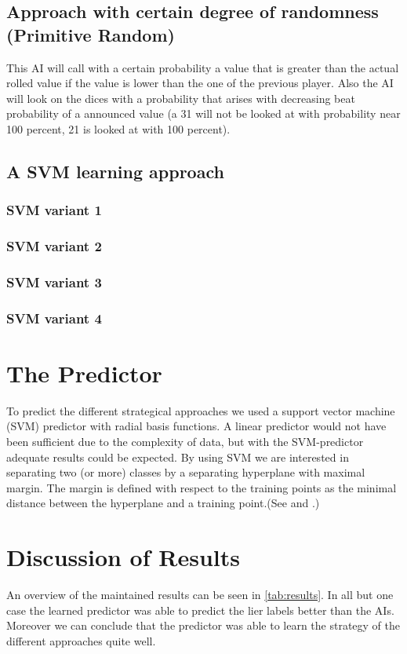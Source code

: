 \documentclass[11pt]{article}
\begin{document}
\subsection{Approach with certain degree of randomness (Primitive Random)}
This AI will call with a certain probability a value that is greater than the actual rolled value if the value is lower than the one of the previous player. Also the AI will look on the dices with a probability that arises with decreasing beat probability of a announced value (a 31 will not be looked at with probability near 100 percent, 21 is looked at with 100 percent). 

\subsection{A SVM learning approach}
\subsubsection{SVM variant 1}
\subsubsection{SVM variant 2}
\subsubsection{SVM variant 3}
\subsubsection{SVM variant 4}

\section{The Predictor}
To predict the different strategical approaches we used a support vector machine (SVM) predictor with radial basis functions. A linear predictor would not have been sufficient due to the complexity of data, but with the SVM-predictor adequate results could be expected.
By using SVM we are interested in separating two (or more) classes by a separating hyperplane with maximal margin. The margin is defined with respect to the training points as the minimal distance between the hyperplane and a training point.(See \cite{luxburg:2016} and \cite[187--227]{Schoellkopf:02}.)

\section{Discussion of Results}
An overview of the maintained results can be seen in \cref{tab:results}.
In all but one case the learned predictor was able to predict the lier labels better than the AIs. Moreover we can conclude that the predictor was able to learn the strategy of the different approaches quite well. 
\end{document}
